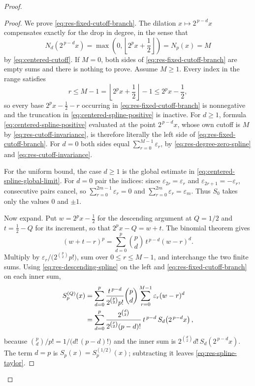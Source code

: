 \documentclass[11pt,oneside]{article}
\theoremstyle{definition}
\theoremstyle{remark}
\begin{document}
\begin{proof}
\begin{proof}
We prove \eqref{eq:res-fixed-cutoff-branch}.  The dilation $x\mapsto2^{\,p-d}x$ compensates
exactly for the drop in degree, in the sense that
\begin{equation}
 N_d\!\left(2^{\,p-d}x\right)
 =\max\left(0,\left\lfloor2^{p}x+\frac12\right\rfloor\right)
 =N_p(x)=M                                                \label{eq:res-cutoff-invariance}
\end{equation}
by \eqref{eq:centered-cutoff}.  If $M=0$, both sides of
\eqref{eq:res-fixed-cutoff-branch} are empty sums and there is nothing to prove.  Assume
$M\ge1$.  Every index in the range satisfies
\[
 r\le M-1=\left\lfloor2^px+\frac12\right\rfloor-1\le2^px-\frac12,
\]
so every base $2^px-\frac12-r$ occurring in \eqref{eq:res-fixed-cutoff-branch} is
nonnegative and the truncation in \eqref{eq:centered-spline-positive} is inactive.  For
$d\ge1$, formula \eqref{eq:centered-spline-positive} evaluated at the point $2^{\,p-d}x$,
whose own cutoff is $M$ by \eqref{eq:res-cutoff-invariance}, is therefore literally the left
side of \eqref{eq:res-fixed-cutoff-branch}.  For $d=0$ both sides equal
$\sum_{r=0}^{M-1}\varepsilon_r$, by \eqref{eq:res-degree-zero-spline} and
\eqref{eq:res-cutoff-invariance}.

For the uniform bound, the case $d\ge1$ is the global estimate in
\eqref{eq:centered-spline-global-limit}.  For $d=0$ pair the indices: since
$\varepsilon_{2r}=\varepsilon_r$ and $\varepsilon_{2r+1}=-\varepsilon_r$, consecutive pairs
cancel, so $\sum_{r=0}^{2m-1}\varepsilon_r=0$ and $\sum_{r=0}^{2m}\varepsilon_r=\varepsilon_m$.
Thus $S_0$ takes only the values $0$ and $\pm1$.

Now expand.  Put $w=2^px-\frac12$ for the descending argument at $Q=1/2$ and
$t=\frac12-Q$ for its increment, so that $2^px-Q=w+t$.  The binomial theorem gives
\[
 (w+t-r)^{p}=\sum_{d=0}^{p}\binom pd\,t^{\,p-d}(w-r)^{d}.
\]
Multiply by $\varepsilon_r\bigl/\bigl(2^{\binom p2}p!\bigr)$, sum over $0\le r\le M-1$, and
interchange the two finite sums.  Using \eqref{eq:res-descending-spline} on the left and
\eqref{eq:res-fixed-cutoff-branch} on each inner sum,
\begin{align}
 S_p^{(Q)}(x)
 &=\sum_{d=0}^{p}\frac{t^{\,p-d}}{2^{\binom p2}p!}\binom pd
   \sum_{r=0}^{M-1}\varepsilon_r(w-r)^{d}                 \notag\\
 &=\sum_{d=0}^{p}\frac{2^{\binom d2}}{2^{\binom p2}(p-d)!}\,t^{\,p-d}\,
   S_d\!\left(2^{\,p-d}x\right),                          \label{eq:res-full-expansion}
\end{align}
because $\binom pd\bigl/p!=1\bigl/\bigl(d!\,(p-d)!\bigr)$ and the inner sum is
$2^{\binom d2}d!\,S_d(2^{\,p-d}x)$.  The term $d=p$ is $S_p(x)=S_p^{(1/2)}(x)$; subtracting
it leaves \eqref{eq:res-spline-taylor}.
\end{proof}


\end{proof}
\end{document}
